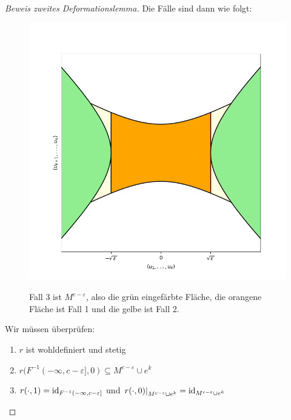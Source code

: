 \begin{proof}[Beweis zweites Deformationslemma]
    Die Fälle sind dann wie folgt:

    \begin{figure}[H]
        \centering
        \includegraphics[width=0.8\linewidth]{resources/Me-Diagram9-handle-cases.png}
        \label{me-diagram9}
        \caption{
            Fall 3 ist $M^{c - \varepsilon}$, also die grün eingefärbte Fläche, die
            orangene Fläche ist Fall 1 und die gelbe ist Fall 2.
        }
    \end{figure}

    Wir müssen überprüfen:
    \begin{enumerate}
        \item $r$ ist wohldefiniert und stetig
        \item $r(F^{-1}(-\infty, c - \varepsilon], 0) \subseteq M^{c - \varepsilon} \cup e^k$
        \item $r(\cdot, 1) = { \operatorname{id} }_{F^{-1}(-\infty, c - \varepsilon]}$ und 
            $\left. r(\cdot , 0) \right\vert_{M^{c - \varepsilon} \cup e^k} 
            = { \operatorname{id} }_{M^{c - \varepsilon} \cup e^k}$
    \end{enumerate}


\end{proof}
